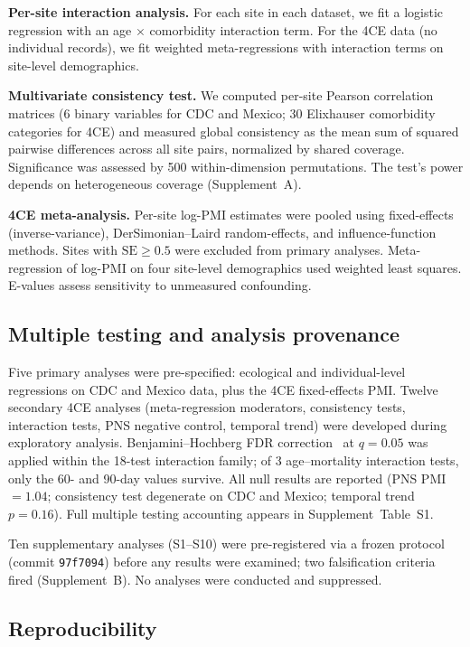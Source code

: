 \documentclass[11pt]{article}
\begin{document}
\textbf{Per-site interaction analysis.}  For each site in each dataset, we
fit a logistic regression with an age $\times$ comorbidity interaction term.
For the 4CE data (no individual records), we fit weighted meta-regressions
with interaction terms on site-level demographics.

\textbf{Multivariate consistency test.}  We computed per-site Pearson
correlation matrices (6 binary variables for CDC and Mexico; 30 Elixhauser
comorbidity categories for 4CE) and measured global consistency as the mean
sum of squared pairwise differences across all site pairs, normalized by
shared coverage.  Significance was assessed by 500 within-dimension
permutations.  The test's power depends on heterogeneous coverage
(Supplement~A).

\textbf{4CE meta-analysis.}  Per-site log-PMI estimates were pooled using
fixed-effects (inverse-variance), DerSimonian--Laird random-effects, and
influence-function methods.  Sites with $\text{SE} \geq 0.5$ were excluded
from primary analyses.  Meta-regression of log-PMI on four site-level
demographics used weighted least squares.  E-values \cite{vanderweele2017}
assess sensitivity to unmeasured confounding.

\subsection{Multiple testing and analysis provenance}

Five primary analyses were pre-specified: ecological and individual-level
regressions on CDC and Mexico data, plus the 4CE fixed-effects PMI.
Twelve secondary 4CE analyses (meta-regression moderators, consistency
tests, interaction tests, PNS negative control, temporal trend) were
developed during exploratory analysis.
Benjamini--Hochberg FDR correction~\cite{benjamini1995fdr} at $q = 0.05$
was applied within the 18-test interaction family; of 3 age--mortality
interaction tests, only the 60- and 90-day values survive.  All null
results are reported (PNS PMI $= 1.04$; consistency test degenerate on
CDC and Mexico; temporal trend $p = 0.16$).  Full multiple testing
accounting appears in Supplement~Table~S1.

Ten supplementary analyses (S1--S10) were pre-registered via a frozen
protocol (commit \texttt{97f7094}) before any results were examined;
two falsification criteria fired (Supplement~B).  No analyses were
conducted and suppressed.

\subsection{Reproducibility}
\end{document}
